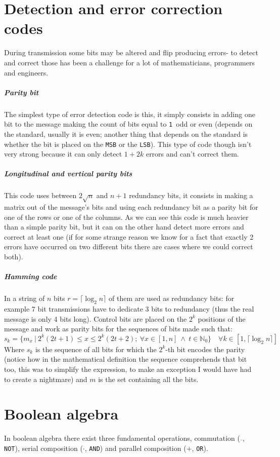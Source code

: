 \documentclass{scrartcl}
\newcommand{\one}{\texttt{1}}
\begin{document}
    \section{Detection and error correction codes}
    During transmission some bits may be altered and flip producing errors- to detect and correct those has been a challenge for a lot of mathematicians, programmers and engineers.
    \subparagraph{Parity bit} The simplest type of error detection code is this, it simply consists in adding one bit to the message making the count of bits equal to \one\ odd or even (depends on the standard, usually it is even; another thing that depends on the standard is whether the bit is placed on the \texttt{MSB} or the \texttt{LSB}). This type of code though isn't very strong because it can only detect $1+2k$ errors and can't correct them.
    \subparagraph{Longitudinal and vertical parity bits} This code uses between $2\sqrt{n}$ and $n+1$ redundancy bits, it consists in making a matrix out of the message's bits and using each redundancy bit as a parity bit for one of the rows or one of the columns. As we can see this code is much heavier than a simple parity bit, but it can on the other hand detect more errors and correct at least one (if for some strange reason we know for a fact that exactly 2 errors have occurred on two different bits there are cases where we could correct both).
    \subparagraph{Hamming code} In a string of $n$ bits $r=\lceil\log_2{n}\rceil$ of them are used as redundancy bits: for example 7 bit transmissions have to dedicate 3 bits to redundancy (thus the real message is only 4 bits long). Control bits are placed on the $2^k$ positions of the message and work as parity bits for the sequences of bits made such that:
    \begin{equation*}
        s_k=\{m_x\ |\ 2^k(2t+1)\le x \le 2^k(2t+2);\ \forall x \in [1,n] \ \land\ t \in \mathbb{N}_0\}\quad \forall k \in [1,\lceil\log_2{n}\rceil]
    \end{equation*} Where $s_k$ is the sequence of all bits for which the $2^k$-th bit encodes the parity (notice how in the mathematical definition the sequence comprehends that bit too, this was to simplify the expression, to make an exception I would have had to create a nightmare) and $m$ is the set containing all the bits.
    \section{Boolean algebra} In boolean algebra there exist three fundamental operations, commutation ($\overline{\ }$, \texttt{NOT}), serial composition ($\cdot$, \texttt{AND}) and parallel composition ($+$, \texttt{OR}).
\end{document}
